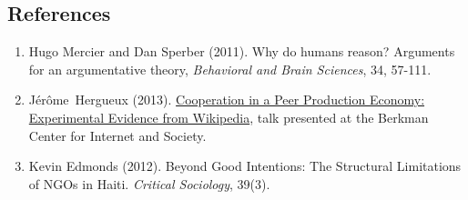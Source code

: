 \hypertarget{references}{%
\subsection{References}\label{references}}

\begin{enumerate}
\def\labelenumi{\arabic{enumi}.}
\item
  Hugo Mercier and Dan Sperber (2011). Why do humans reason? Arguments
  for an argumentative theory, \emph{Behavioral and Brain Sciences}, 34,
  57-111.
\item
  Jérôme~Hergueux (2013).
  \href{https://cyber.law.harvard.edu/interactive/events/luncheons/2013/11/jerome}{Cooperation
  in a Peer Production Economy: Experimental Evidence from Wikipedia},
  talk presented at the Berkman Center for Internet and Society.
\item
  Kevin Edmonds (2012). Beyond Good Intentions: The Structural
  Limitations of NGOs in Haiti. \emph{Critical Sociology}, 39(3).
\end{enumerate}
